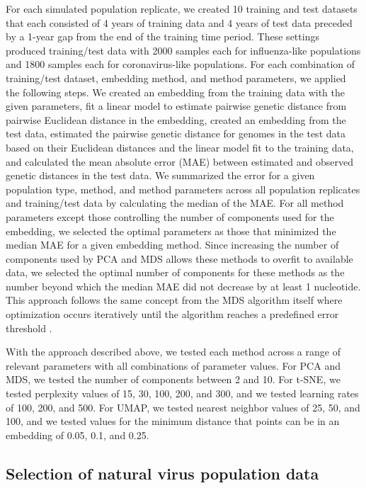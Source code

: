 \documentclass[10pt,letterpaper]{article}
\begin{document}
For each simulated population replicate, we created 10 training and test datasets that each consisted of 4 years of training data and 4 years of test data preceded by a 1-year gap from the end of the training time period.
These settings produced training/test data with 2000 samples each for influenza-like populations and 1800 samples each for coronavirus-like populations.
For each combination of training/test dataset, embedding method, and method parameters, we applied the following steps.
We created an embedding from the training data with the given parameters, fit a linear model to estimate pairwise genetic distance from pairwise Euclidean distance in the embedding, created an embedding from the test data, estimated the pairwise genetic distance for genomes in the test data based on their Euclidean distances and the linear model fit to the training data, and calculated the mean absolute error (MAE) between estimated and observed genetic distances in the test data.
We summarized the error for a given population type, method, and method parameters across all population replicates and training/test data by calculating the median of the MAE.
For all method parameters except those controlling the number of components used for the embedding, we selected the optimal parameters as those that minimized the median MAE for a given embedding method.
Since increasing the number of components used by PCA and MDS allows these methods to overfit to available data, we selected the optimal number of components for these methods as the number beyond which the median MAE did not decrease by at least 1 nucleotide.
This approach follows the same concept from the MDS algorithm itself where optimization occurs iteratively until the algorithm reaches a predefined error threshold \cite{hout_papesh_goldinger_2012}.

With the approach described above, we tested each method across a range of relevant parameters with all combinations of parameter values.
For PCA and MDS, we tested the number of components between 2 and 10.
For t-SNE, we tested perplexity values of 15, 30, 100, 200, and 300, and we tested learning rates of 100, 200, and 500.
For UMAP, we tested nearest neighbor values of 25, 50, and 100, and we tested values for the minimum distance that points can be in an embedding of 0.05, 0.1, and 0.25.

\subsection*{Selection of natural virus population data}
\end{document}
